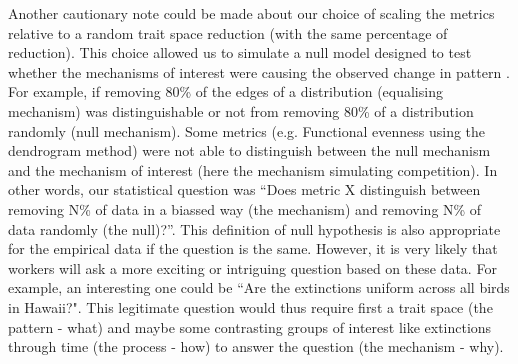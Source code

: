 \documentclass[12pt,letterpaper]{article}
\begin{document}
Another cautionary note could be made about our choice of scaling the metrics relative to a random trait space reduction (with the same percentage of reduction).
This choice allowed us to simulate a null model designed to test whether the mechanisms of interest were causing the observed change in pattern \citep{bausman2018modeling}.
For example, if removing 80\% of the edges of a distribution (equalising mechanism) was distinguishable or not from removing 80\% of a distribution randomly (null mechanism).
Some metrics (e.g. Functional evenness using the dendrogram method) were not able to distinguish between the null mechanism and the mechanism of interest (here the mechanism simulating competition).
In other words, our statistical question was ``Does metric X distinguish between removing N\% of data in a biassed way (the mechanism) and removing N\% of data randomly (the null)?''.
This definition of null hypothesis is also appropriate for the empirical data if the question is the same.
However, it is very likely that workers will ask a more exciting or intriguing question based on these data.
For example, an interesting one could be ``Are the extinctions uniform across all birds in Hawaii?".
This legitimate question would thus require first a trait space (the pattern - what) and maybe some contrasting groups of interest like extinctions through time (the process - how) to answer the question (the mechanism - why). %

\end{document}

